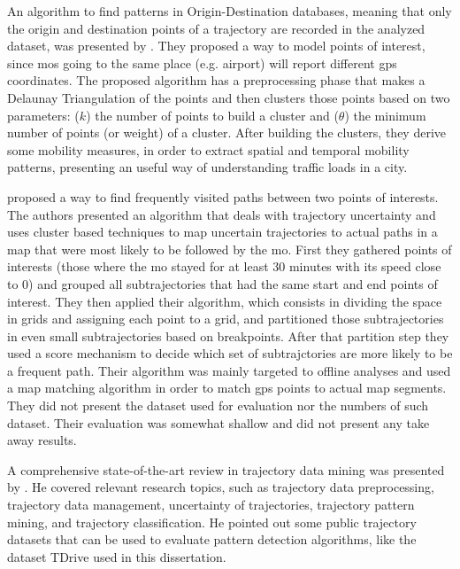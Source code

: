 An algorithm to find patterns in Origin-Destination databases, meaning that only the origin and destination points of a
trajectory are recorded in the analyzed dataset, was presented by . They proposed a
way to model points of interest, since \acp{mo} going to the same place (e.g. airport) will report different \ac{gps}
coordinates. The proposed algorithm has a preprocessing phase that makes a Delaunay Triangulation of the points and then
clusters those points based on two parameters: ($k$) the number of points to build a cluster and ($\theta$) the minimum
number of points (or weight) of a cluster. After building the clusters, they derive some mobility measures, in order to
extract spatial and temporal mobility patterns, presenting an useful way of understanding traffic loads in a city.

 proposed a way to find frequently visited paths between two points of interests. The authors
presented an algorithm that deals with trajectory uncertainty and uses cluster based techniques to map uncertain
trajectories to actual paths in a map that were most likely to be followed by the \ac{mo}. First they gathered points of
interests (those where the \ac{mo} stayed for at least 30 minutes with its speed close to 0) and grouped all
subtrajectories that had the same start and end points of interest. They then applied their algorithm, which consists in
dividing the space in grids and assigning each point to a grid, and partitioned those subtrajectories in even small
subtrajectories based on breakpoints. After that partition step they used a score mechanism to decide which set of
subtrajctories are more likely to be a frequent path. Their algorithm was mainly targeted to offline analyses and used a
map matching algorithm in order to match \ac{gps} points to actual map segments. They did not present the dataset used
for evaluation nor the numbers of such dataset. Their evaluation was somewhat shallow and did not present any take away
results.

A comprehensive state-of-the-art review in trajectory data mining was presented by . He covered
relevant research topics, such as trajectory data preprocessing, trajectory data management, uncertainty of
trajectories, trajectory pattern mining, and trajectory classification. He pointed out some public trajectory datasets
that can be used to evaluate pattern detection algorithms, like the dataset TDrive \cite{tdrive} used in this
dissertation.

